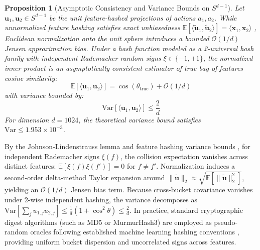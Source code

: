 \documentclass[journal]{IEEEtran}
\newtheorem{proposition}{Proposition}
\begin{document}
\begin{proposition}[Asymptotic Consistency and Variance Bounds on $S^{d-1}$]
Let $\mathbf{u}_1, \mathbf{u}_2 \in S^{d-1}$ be the unit feature-hashed projections of actions $a_1, a_2$. While unnormalized feature hashing satisfies exact unbiasedness $\mathbb{E}[\langle \tilde{\mathbf{u}}_1, \tilde{\mathbf{u}}_2 \rangle] = \langle \mathbf{x}_1, \mathbf{x}_2 \rangle$ \cite{weinberger2009feature}, Euclidean normalization onto the unit sphere introduces a bounded $\mathcal{O}(1/d)$ Jensen approximation bias. Under a hash function modeled as a 2-universal hash family with independent Rademacher random signs $\xi \in \{-1, +1\}$, the normalized inner product is an asymptotically consistent estimator of true bag-of-features cosine similarity:
\begin{equation}
\mathbb{E}[\langle \mathbf{u}_1, \mathbf{u}_2 \rangle] = \cos(\theta_{\text{true}}) + \mathcal{O}(1/d)
\end{equation}
with variance bounded by:
\begin{equation}
\mathrm{Var}[\langle \mathbf{u}_1, \mathbf{u}_2 \rangle] \le \frac{2}{d}
\end{equation}
For dimension $d = 1024$, the theoretical variance bound satisfies $\mathrm{Var} \le 1.953 \times 10^{-3}$.
\end{proposition}
\begin{IEEEproof}
By the Johnson-Lindenstrauss lemma and feature hashing variance bounds \cite{weinberger2009feature}, for independent Rademacher signs $\xi(f)$, the collision expectation vanishes across distinct features: $\mathbb{E}[\xi(f)\xi(f')] = 0$ for $f \neq f'$. Normalization induces a second-order delta-method Taylor expansion around $\|\tilde{\mathbf{u}}\|_2 \approx \sqrt{\mathbb{E}[\|\tilde{\mathbf{u}}\|_2^2]}$, yielding an $\mathcal{O}(1/d)$ Jensen bias term. Because cross-bucket covariance vanishes under 2-wise independent hashing, the variance decomposes as $\mathrm{Var}[\sum_j u_{1,j} u_{2,j}] \le \frac{1}{d} (1 + \cos^2\theta) \le \frac{2}{d}$. In practice, standard cryptographic digest algorithms (such as MD5 or MurmurHash3) are employed as pseudo-random oracles following established machine learning hashing conventions \cite{weinberger2009feature}, providing uniform bucket dispersion and uncorrelated signs across features.
\end{IEEEproof}
\end{document}
